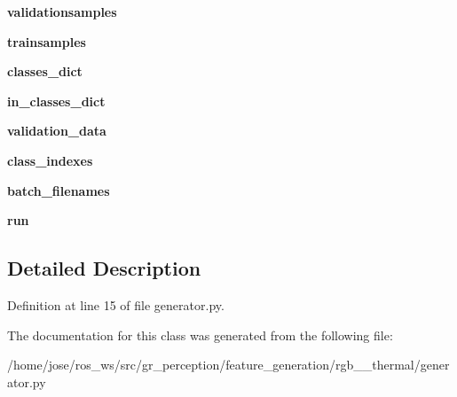 \begin{DoxyCompactItemize}
{\bfseries validationsamples}
\item 
\mbox{\label{classgenerator_1_1SuperGeneratorV2_af54329df3b99191670f8e4d50c36eccd}} 
{\bfseries trainsamples}
\item 
\mbox{\label{classgenerator_1_1SuperGeneratorV2_aaf374004d45296a6dc31fa7ed868ff0b}} 
{\bfseries classes\+\_\+dict}
\item 
\mbox{\label{classgenerator_1_1SuperGeneratorV2_a8d6fe04df3a1bd1739fd423039546451}} 
{\bfseries in\+\_\+classes\+\_\+dict}
\item 
\mbox{\label{classgenerator_1_1SuperGeneratorV2_a93c56bfe7fb3225d58ec6b09f5c6c328}} 
{\bfseries validation\+\_\+data}
\item 
\mbox{\label{classgenerator_1_1SuperGeneratorV2_ab28364e2f978d51b74c0efb10ee1270a}} 
{\bfseries class\+\_\+indexes}
\item 
\mbox{\label{classgenerator_1_1SuperGeneratorV2_ad981283dc70c7d8222c6f275519c58c1}} 
{\bfseries batch\+\_\+filenames}
\item 
\mbox{\label{classgenerator_1_1SuperGeneratorV2_af3f50a18650dbceee6e0b0dea07ad54d}} 
{\bfseries run}
\end{DoxyCompactItemize}


\subsection{Detailed Description}


Definition at line 15 of file generator.\+py.



The documentation for this class was generated from the following file\+:\begin{DoxyCompactItemize}
\item 
/home/jose/ros\+\_\+ws/src/gr\+\_\+perception/feature\+\_\+generation/rgb\+\_\+\_\+thermal/generator.\+py\end{DoxyCompactItemize}
